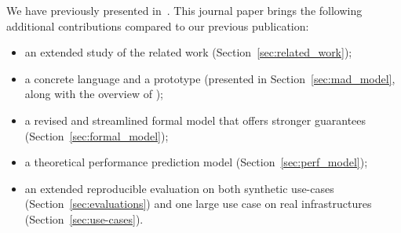We have previously presented \mad in~\cite{chardet:hal-01858150}. This
journal paper brings the following additional contributions compared
to our previous publication:
\begin{itemize}
\item an extended study of the related work (Section~\ref{sec:related_work});
\item a concrete language and a prototype (presented in
  Section~\ref{sec:mad_model}, along with the overview of \mad);
\item a revised and streamlined formal model that offers stronger
  guarantees (Section~\ref{sec:formal_model});
\item a theoretical performance prediction model
  (Section~\ref{sec:perf_model});
\item an extended reproducible evaluation on both synthetic use-cases
  (Section~\ref{sec:evaluations}) and one large use case on real
  infrastructures (Section~\ref{sec:use-cases}).
\end{itemize}





